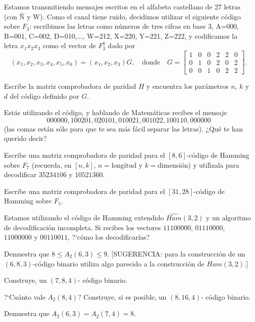 \begin{problem}[5]
 Estamos transmitiendo mensajes escritos en el alfabeto
castellano de 27 letras (con Ñ y W). Como el canal tiene ruido,
decidimos utilizar el siguiente código sobre $ F_3$: escribimos
las letras como números de tres cifras en base 3, A=000, B=001,
C=002, D=010,..., W=212, X=220, Y=221, Z=222, y codificamos la
letra $x_1x_2x_3$ como el vector de $ F_3^6$ dado por
$$(x_1,x_2,x_3,x_4,x_5,x_6)=(x_1,x_2,x_3)G, \quad\text{donde}\quad
G=\left[\begin{array}{cccccc} 1&0&0&2&2&0\\ 0&1&0&2&0&2\\
0&0&1&0&2&2
\end{array}\right].$$

\ppart Escribe la matriz comprobadora de paridad $H$ y encuentra los
parámetros $n$, $k$ y $d$ del código definido por $G$.

\ppart Estás utilizando el código, y hablando de Matemáticas recibes
el mensaje $$000000,100201,020101,010021,001022,100110,000000$$
(las comas están sólo para que te sea más fácil separar las
letras). ¿Qué te han querido decir?

\solution
\end{problem}


\begin{problem}[6]
\ppart Escribe una matriz comprobadora de paridad para el $[8,6]$-código de Hamming
sobre $ F_7$ (recuerda, en $[n,k]$, $n=$longitud y $k=$dimensión)
y util\'{\i}zala para decodificar $35234106$ y $10521360$.

\ppart  Escribe una matriz comprobadora de paridad para el
$[31,28]$-código de Hamming sobre $ F_5$.


\solution
\end{problem}


\begin{problem}[7]
Estamos utilizando el código de Hamming extendido
$\widehat{Ham} (3,2)$  y un algoritmo de decodificación
incompleta. Si recibes los vectores $11100000$, $01110000$,
$11000000$ y $00110011$, ?`cómo los decodificarías?

\solution
\end{problem}



\begin{problem}[8]
\ppart Demuestra que $8\le A_2(6,3)\le 9$. [SUGERENCIA: para la construcción
de un $(6,8,3)$-código binario utiliza algo parecido a la
construcción de $Ham(3,2)$.]

\ppart   Construye, un
$(7,8,4)$- código binario.

\ppart ?`Cuánto vale $A_2(8,4)$? Construye, si es posible, un
$(8,16,4)$- código binario.

\ppart Demuestra que $A_2(6,3)=A_2(7,4)=8$.
\solution
\end{problem}

